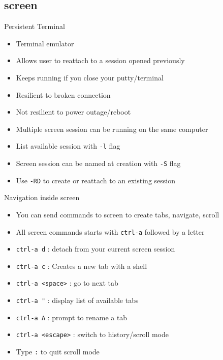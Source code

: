 \subsection{screen}

\begin{frame}{Persistent Terminal}
\begin{itemize}
\pause \item Terminal emulator
\pause \item Allows user to reattach to a session opened previously
\pause \item Keeps running if you close your putty/terminal
\pause \item Resilient to broken connection
\pause \item Not resilient to power outage/reboot
\pause \item Multiple screen session can be running on the same computer
\pause \item List available session with \texttt{-l} flag
\pause \item Screen session can be named at creation with \texttt{-S} flag
\pause \item Use \texttt{-RD} to create or reattach to an existing session
\end{itemize}
\end{frame}

\begin{frame}{Navigation inside screen}
\begin{itemize}
  \pause \item You can send commands to screen to create tabs, navigate, scroll
  \pause \item All screen commands starts with \texttt{ctrl-a} followed by a letter
  \pause \item \texttt{ctrl-a d} : detach from your current screen session
  \pause \item \texttt{ctrl-a c} : Creates a new tab with a shell
  \pause \item \texttt{ctrl-a <space>} : go to next tab
  \pause \item \texttt{ctrl-a "} : display list of available tabs
  \pause \item \texttt{ctrl-a A} : prompt to rename a tab
  \pause \item \texttt{ctrl-a <escape>} : switch to history/scroll mode
  \pause \item Type \texttt{:} to quit scroll mode
\end{itemize}
\end{frame}


